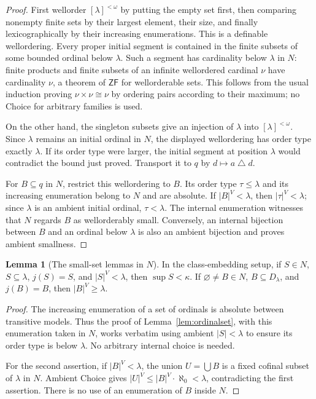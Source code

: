 \documentclass[11pt,letterpaper]{article}
\theoremstyle{definition}
\newtheorem{lemma}[definition]{Lemma}
\numberwithin{equation}{section}
\newcommand{\ZF}{\mathsf{ZF}}
\newcommand{\symdiff}{\mathbin{\triangle}}
\begin{document}
\begin{proof}
First wellorder $[\lambda]^{<\omega}$ by putting the empty set first, then comparing nonempty finite sets by their largest element, their size, and finally lexicographically by their increasing enumerations. This is a definable wellordering. Every proper initial segment is contained in the finite subsets of some bounded ordinal below $\lambda$. Such a segment has cardinality below $\lambda$ in $N$: finite products and finite subsets of an infinite wellordered cardinal $\nu$ have cardinality $\nu$, a theorem of $\ZF$ for wellorderable sets. This follows from the usual induction proving $\nu\times\nu\cong\nu$ by ordering pairs according to their maximum; no Choice for arbitrary families is used.

On the other hand, the singleton subsets give an injection of $\lambda$ into $[\lambda]^{<\omega}$. Since $\lambda$ remains an initial ordinal in $N$, the displayed wellordering has order type exactly $\lambda$. If its order type were larger, the initial segment at position $\lambda$ would contradict the bound just proved. Transport it to $q$ by $d\mapsto a\symdiff d$.

For $B\subseteq q$ in $N$, restrict this wellordering to $B$. Its order type $\tau\le\lambda$ and its increasing enumeration belong to $N$ and are absolute. If $|B|^V<\lambda$, then $|\tau|^V<\lambda$; since $\lambda$ is an ambient initial ordinal, $\tau<\lambda$. The internal enumeration witnesses that $N$ regards $B$ as wellorderably small. Conversely, an internal bijection between $B$ and an ordinal below $\lambda$ is also an ambient bijection and proves ambient smallness.
\end{proof}

\begin{lemma}[The small-set lemmas in $N$]\label{lem:Nsmall}
In the class-embedding setup, if $S\in N$, $S\subseteq\lambda$, $j(S)=S$, and $|S|^V<\lambda$, then $\sup S<\kappa$. If $\varnothing\ne B\in N$, $B\subseteq D_\lambda$, and $j(B)=B$, then $|B|^V\ge\lambda$.
\end{lemma}

\begin{proof}
The increasing enumeration of a set of ordinals is absolute between transitive models. Thus the proof of Lemma~\ref{lem:ordinalset}, with this enumeration taken in $N$, works verbatim using ambient $|S|<\lambda$ to ensure its order type is below $\lambda$. No arbitrary internal choice is needed.

For the second assertion, if $|B|^V<\lambda$, the union $U=\bigcup B$ is a fixed cofinal subset of $\lambda$ in $N$. Ambient Choice gives $|U|^V\le |B|^V\cdot\aleph_0<\lambda$, contradicting the first assertion. There is no use of an enumeration of $B$ inside $N$.
\end{proof}
\end{document}
